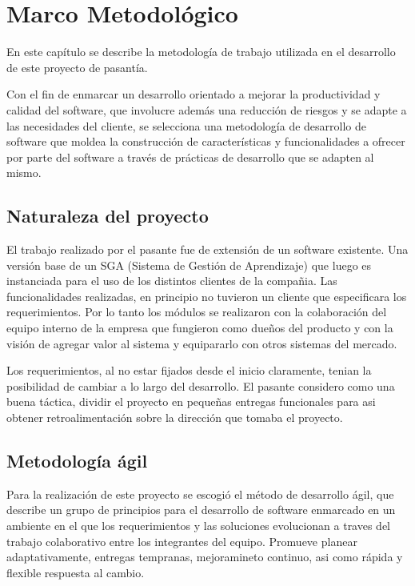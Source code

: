 \chapter{Marco Metodológico}
\thispagestyle{empty} %

En este capítulo se describe la metodología de trabajo utilizada en el desarrollo de este proyecto de pasantía.

Con el fin de enmarcar un desarrollo orientado a mejorar la productividad y calidad del software, que involucre además una reducción de riesgos y se adapte a las necesidades del cliente, se selecciona una metodología de desarrollo de software que moldea la construcción de características y funcionalidades a ofrecer por parte del software a través de prácticas de desarrollo que se adapten al mismo.

\section{Naturaleza del proyecto}
El trabajo realizado por el pasante fue de extensión de un software existente. Una versión base de un SGA (Sistema de Gestión de Aprendizaje) que luego es instanciada para el uso de los distintos clientes de la compañia. Las funcionalidades realizadas, en principio no tuvieron un cliente que especificara los requerimientos. Por lo tanto los módulos se realizaron con la colaboración del equipo interno de la empresa que fungieron como dueños del producto y con la visión de agregar valor al sistema y equipararlo con otros sistemas del mercado.

Los requerimientos, al no estar fijados desde el inicio claramente, tenian la posibilidad de cambiar a lo largo del desarrollo. El pasante considero como una buena táctica, dividir el proyecto en pequeñas entregas funcionales para asi obtener retroalimentación sobre la dirección que tomaba el proyecto.

\section{Metodología ágil}

Para la realización de este proyecto se escogió el método de desarrollo ágil, que describe un grupo de principios para el desarrollo de software enmarcado en un ambiente en el que los requerimientos  y las soluciones evolucionan a traves del trabajo colaborativo entre los integrantes del equipo. Promueve planear adaptativamente, entregas tempranas, mejoramineto continuo, asi como rápida y flexible respuesta al cambio.

